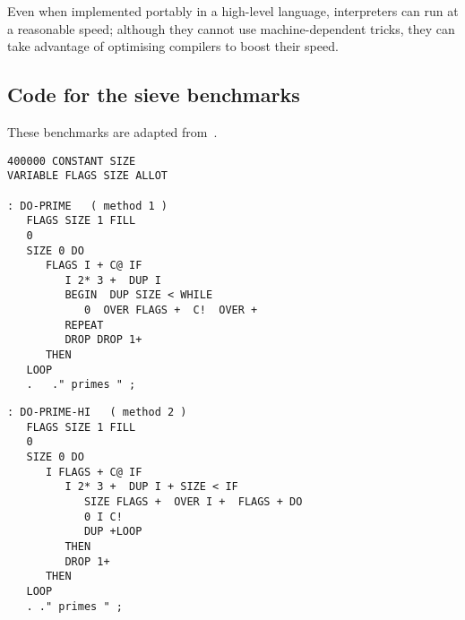 \documentclass{article}
\begin{document}
Even when implemented portably in a high-level language, interpreters can run
at a reasonable speed; although they cannot use machine-dependent tricks,
they can take advantage of optimising compilers to boost their speed.





\newpage
\begin{appendix}
\section{Code for the sieve benchmarks}
\label{code}

These benchmarks are adapted from~\cite{forthsieve}.

\begin{verbatim}
400000 CONSTANT SIZE
VARIABLE FLAGS SIZE ALLOT

: DO-PRIME   ( method 1 )
   FLAGS SIZE 1 FILL
   0
   SIZE 0 DO
      FLAGS I + C@ IF
         I 2* 3 +  DUP I
         BEGIN  DUP SIZE < WHILE
            0  OVER FLAGS +  C!  OVER +
         REPEAT
         DROP DROP 1+
      THEN
   LOOP
   .   ." primes " ;
\end{verbatim}

\begin{verbatim}
: DO-PRIME-HI   ( method 2 )
   FLAGS SIZE 1 FILL
   0
   SIZE 0 DO
      I FLAGS + C@ IF
         I 2* 3 +  DUP I + SIZE < IF
            SIZE FLAGS +  OVER I +  FLAGS + DO
            0 I C!
            DUP +LOOP
         THEN
         DROP 1+
      THEN
   LOOP
   . ." primes " ;
\end{verbatim}
\end{appendix}
\end{document}
